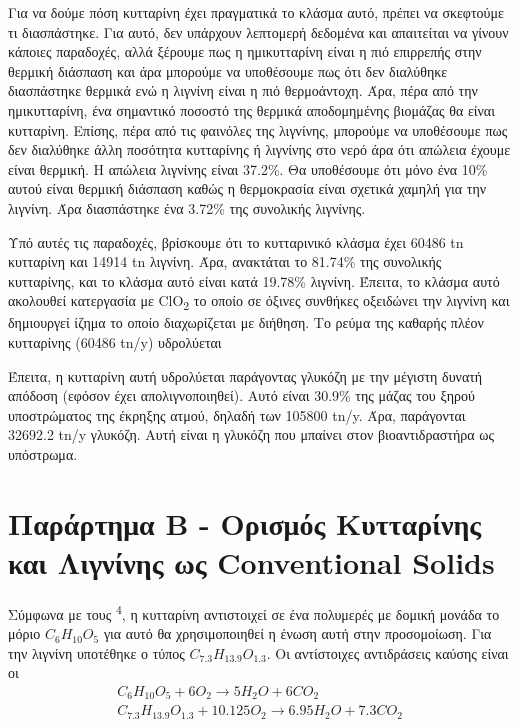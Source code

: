 \documentclass[11pt]{article}
\makeatletter
\newcommand{\citeprocitem}[2]{\hyper@linkstart{cite}{citeproc_bib_item_#1}#2\hyper@linkend}
\makeatother
\begin{document}
Για να δούμε πόση κυτταρίνη έχει πραγματικά το κλάσμα αυτό, πρέπει να σκεφτούμε τι διασπάστηκε. Για αυτό, δεν υπάρχουν λεπτομερή δεδομένα και απαιτείται να γίνουν κάποιες παραδοχές, αλλά ξέρουμε πως η ημικυτταρίνη είναι η πιό επιρρεπής στην θερμική διάσπαση και άρα μπορούμε να υποθέσουμε πως ότι δεν διαλύθηκε διασπάστηκε θερμικά ενώ η λιγνίνη είναι η πιό θερμοάντοχη. Άρα, πέρα από την ημικυτταρίνη, ένα σημαντικό ποσοστό της θερμικά αποδομημένης βιομάζας θα είναι κυτταρίνη. Επίσης, πέρα από τις φαινόλες της λιγνίνης, μπορούμε να υποθέσουμε πως δεν διαλύθηκε άλλη ποσότητα κυτταρίνης ή λιγνίνης στο νερό άρα ότι απώλεια έχουμε είναι θερμική. Η απώλεια λιγνίνης είναι 37.2\%. Θα υποθέσουμε ότι μόνο ένα 10\% αυτού είναι θερμική διάσπαση καθώς η θερμοκρασία είναι σχετικά χαμηλή για την λιγνίνη. Άρα διασπάστηκε ένα 3.72\% της συνολικής λιγνίνης.

Υπό αυτές τις παραδοχές, βρίσκουμε ότι το κυτταρινικό κλάσμα έχει 60486 tn κυτταρίνη και 14914 tn λιγνίνη. Άρα, ανακτάται το 81.74\% της συνολικής κυτταρίνης, και το κλάσμα αυτό είναι κατά 19.78\% λιγνίνη. Έπειτα, το κλάσμα αυτό ακολουθεί κατεργασία με ClO\textsubscript{2} το οποίο σε όξινες συνθήκες οξειδώνει την λιγνίνη και δημιουργεί ίζημα το οποίο διαχωρίζεται με διήθηση. Το ρεύμα της καθαρής πλέον κυτταρίνης (60486 tn/y) υδρολύεται 

Έπειτα, η κυτταρίνη αυτή υδρολύεται παράγοντας γλυκόζη με την μέγιστη δυνατή απόδοση (εφόσον έχει απολιγνοποιηθεί). Αυτό είναι 30.9\% της μάζας του ξηρού υποστρώματος της έκρηξης ατμού, δηλαδή των 105800 tn/y. Άρα, παράγονται 32692.2 tn/y γλυκόζη. Αυτή είναι η γλυκόζη που μπαίνει στον βιοαντιδραστήρα ως υπόστρωμα.

\section{Παράρτημα Β - Ορισμός Κυτταρίνης και Λιγνίνης ως Conventional Solids}
\label{sec:org3e684cc}
Σύμφωνα με τους \textsuperscript{\citeprocitem{4}{4}}, η κυτταρίνη αντιστοιχεί σε ένα πολυμερές με δομική μονάδα το μόριο \(C_6H_{10}O_5\) για αυτό θα χρησιμοποιηθεί η ένωση αυτή στην προσομοίωση. Για την λιγνίνη υποτέθηκε ο τύπος \(C_{7.3}H_{13.9}O_{1.3}\). Οι αντίστοιχες αντιδράσεις καύσης είναι οι
\begin{align*}
C_6H_{10}O_5 + 6O_2 \rightarrow 5H_2O + 6CO_2 \\ C_{7.3}H_{13.9}O_{1.3} + 10.125O_2 \rightarrow 6.95 H_2O + 7.3CO_2
\end{align*} 
\end{document}
